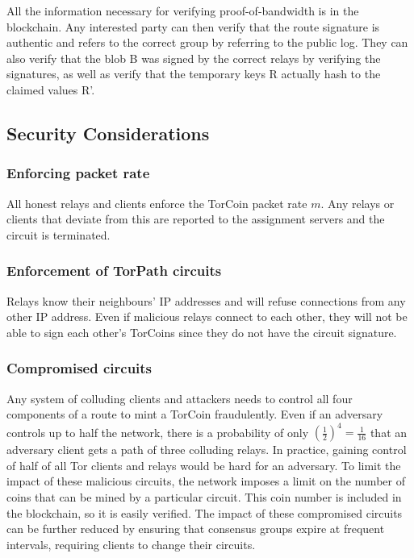 All the information necessary for verifying proof-of-bandwidth is in the
blockchain. Any interested party can then verify that the route signature is
authentic and refers to the correct group by referring to the public log. They
can also verify that the blob B was signed by the correct relays by verifying
the signatures, as well as verify that the temporary keys R actually hash to
the claimed values R'.

\subsection{Security Considerations}

\subsubsection{Enforcing packet rate} All honest relays and clients
enforce the TorCoin packet rate $m$. Any relays or clients that deviate from this
are reported to the assignment servers and the circuit is terminated.

\subsubsection{Enforcement of TorPath circuits} Relays know their neighbours'
IP addresses and will refuse connections from any other IP address. Even if
malicious relays connect to each other, they will not be able to sign each
other's TorCoins since they do not have the circuit signature.

\subsubsection{Compromised circuits} Any system of colluding clients and
attackers needs to control all four components of a route to mint a TorCoin
fraudulently. Even if an adversary controls up to half the network, there is a
probability of only $(\frac{1}{2})^4 = \frac{1}{16}$ that an adversary client
gets a path of three colluding relays. In practice, gaining control of half of
all Tor clients and relays would be hard for an adversary.  To limit the
impact of these malicious circuits, the network imposes a limit on the number
of coins that can be mined by a particular circuit. This coin number is
included in the blockchain, so it is easily verified. The impact of these
compromised circuits can be further reduced by ensuring that consensus groups
expire at frequent intervals, requiring clients to change their circuits.


